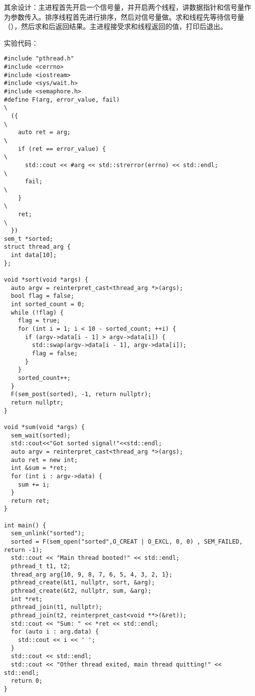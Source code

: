 \documentclass{ctexrep}
\begin{document}
其余设计：主进程首先开启一个信号量，并开启两个线程，讲数据指针和信号量作为参数传入。排序线程首先进行排序，然后对信号量做。求和线程先等待信号量（），然后求和后返回结果。主进程接受求和线程返回的值，打印后退出。

实验代码：

\begin{verbatim}
#include "pthread.h"
#include <cerrno>
#include <iostream>
#include <sys/wait.h>
#include <semaphore.h>
#define F(arg, error_value, fail)                                              \
  ({                                                                           \
    auto ret = arg;                                                            \
    if (ret == error_value) {                                                  \
      std::cout << #arg << std::strerror(errno) << std::endl;                  \
      fail;                                                                    \
    }                                                                          \
    ret;                                                                       \
  })
sem_t *sorted;
struct thread_arg {
  int data[10];
};

void *sort(void *args) {
  auto argv = reinterpret_cast<thread_arg *>(args);
  bool flag = false;
  int sorted_count = 0;
  while (!flag) {
    flag = true;
    for (int i = 1; i < 10 - sorted_count; ++i) {
      if (argv->data[i - 1] > argv->data[i]) {
        std::swap(argv->data[i - 1], argv->data[i]);
        flag = false;
      }
    }
    sorted_count++;
  }
  F(sem_post(sorted), -1, return nullptr);
  return nullptr;
}

void *sum(void *args) {
  sem_wait(sorted);
  std::cout<<"Got sorted signal!"<<std::endl;
  auto argv = reinterpret_cast<thread_arg *>(args);
  auto ret = new int;
  int &sum = *ret;
  for (int i : argv->data) {
    sum += i;
  }
  return ret;
}

int main() {
  sem_unlink("sorted");
  sorted = F(sem_open("sorted",O_CREAT | O_EXCL, 0, 0) , SEM_FAILED, return -1);
  std::cout << "Main thread booted!" << std::endl;
  pthread_t t1, t2;
  thread_arg arg{10, 9, 8, 7, 6, 5, 4, 3, 2, 1};
  pthread_create(&t1, nullptr, sort, &arg);
  pthread_create(&t2, nullptr, sum, &arg);
  int *ret;
  pthread_join(t1, nullptr);
  pthread_join(t2, reinterpret_cast<void **>(&ret));
  std::cout << "Sum: " << *ret << std::endl;
  for (auto i : arg.data) {
    std::cout << i << ' ';
  }
  std::cout << std::endl;
  std::cout << "Other thread exited, main thread quitting!" << std::endl;
  return 0;
}
\end{verbatim}
\end{document}
